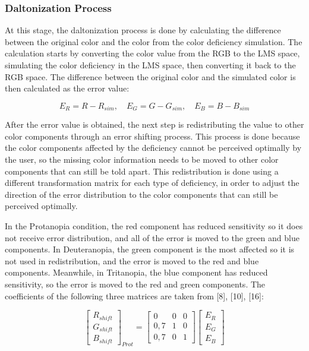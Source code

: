\subsubsection{Daltonization Process}

At this stage, the daltonization process is done by calculating the difference between the original color and the color from the color deficiency simulation. The calculation starts by converting the color value from the RGB to the LMS space, simulating the color deficiency in the LMS space, then converting it back to the RGB space. The difference between the original color and the simulated color is then calculated as the error value:

\begin{equation}
E_R = R - R_{sim}, \quad E_G = G - G_{sim}, \quad E_B = B - B_{sim}
\end{equation}

After the error value is obtained, the next step is redistributing the value to other color components through an error shifting process. This process is done because the color components affected by the deficiency cannot be perceived optimally by the user, so the missing color information needs to be moved to other color components that can still be told apart. This redistribution is done using a different transformation matrix for each type of deficiency, in order to adjust the direction of the error distribution to the color components that can still be perceived optimally.

In the Protanopia condition, the red component has reduced sensitivity so it does not receive error distribution, and all of the error is moved to the green and blue components. In Deuteranopia, the green component is the most affected so it is not used in redistribution, and the error is moved to the red and blue components. Meanwhile, in Tritanopia, the blue component has reduced sensitivity, so the error is moved to the red and green components. The coefficients of the following three matrices are taken from [8], [10], [16]:

\begin{equation}
\begin{bmatrix} R_{shift} \\ G_{shift} \\ B_{shift} \end{bmatrix}_{Prot} =
\begin{bmatrix} 0 & 0 & 0 \\ 0{,}7 & 1 & 0 \\ 0{,}7 & 0 & 1 \end{bmatrix}
\begin{bmatrix} E_R \\ E_G \\ E_B \end{bmatrix}
\end{equation}

